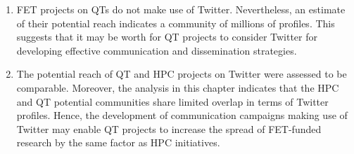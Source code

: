 \begin{enumerate}
 \item FET projects on QTs do not make use of Twitter. Nevertheless, an estimate of their potential reach indicates a community of millions of profiles. This suggests that it may be worth for QT projects to consider Twitter for developing effective communication and dissemination strategies.
 \item The potential reach of QT and HPC projects on Twitter were assessed to be comparable. Moreover, the analysis in this chapter indicates that the HPC and QT potential communities share limited overlap in terms of Twitter profiles. Hence, the development of communication campaigns making use of Twitter may enable QT projects to increase the spread of FET-funded research by the same factor as HPC initiatives.         
\end{enumerate}